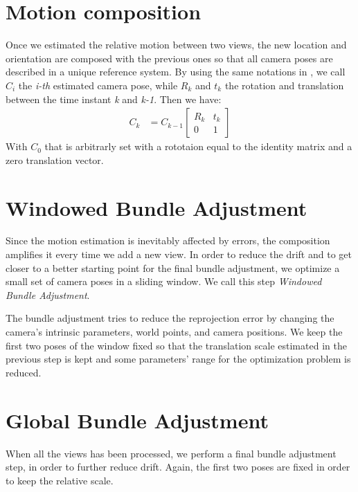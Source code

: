 \section{Motion composition}
Once we estimated the relative motion between two views, the new location and 
orientation are composed with the previous ones so that all camera poses are
described in a unique reference system. By using the same notations in 
\cite{scaramuzzaVisualOdometryI}, we call \( C_i \) the \textit{i-th} 
estimated camera pose, while \( R_k \) and \( t_k \) the rotation and 
translation between the time instant \textit{k} and \textit{k-1}. Then we have:
\begin{align}
	C_k &= C_{k-1}
	\begin{bmatrix}
		R_k & t_k \\
		0 & 1
	\end{bmatrix}
\end{align}
With \( C_0 \) that is arbitrarly set with a rototaion equal to the identity
matrix and a zero translation vector.

\section{Windowed Bundle Adjustment}
Since the motion estimation is inevitably affected by errors,  
the composition amplifies it every time we add a new
view. In order to reduce the drift and to get closer to a better starting point 
for the final bundle adjustment, we optimize a small set of camera poses in 
a sliding window. We call this step \textit{Windowed Bundle Adjustment}.

The bundle adjustment tries to reduce the reprojection error by changing the
camera's intrinsic parameters, world points, and camera positions. 
We keep the first two poses of the window fixed so that the translation scale 
estimated in the previous step is kept and some parameters' range for the 
optimization problem is reduced.

\section{Global Bundle Adjustment}
When all the views has been processed, we perform a final bundle adjustment 
step, in order to further reduce drift. Again, the first two poses are fixed in 
order to keep the relative scale.
